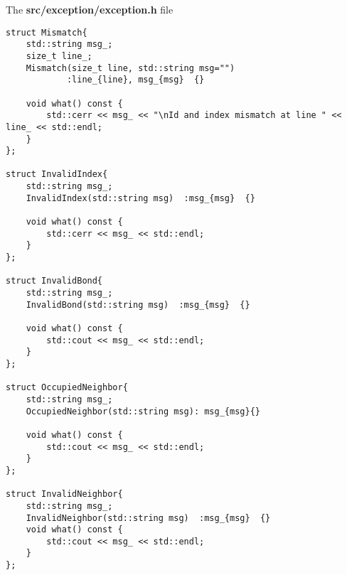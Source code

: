 
The \textbf{src/exception/exception.h} file

\begin{lstlisting}[style=CStyle]
struct Mismatch{
    std::string msg_;
    size_t line_;
    Mismatch(size_t line, std::string msg="")
            :line_{line}, msg_{msg}  {}

    void what() const {
        std::cerr << msg_ << "\nId and index mismatch at line " << line_ << std::endl;
    }
};

struct InvalidIndex{
    std::string msg_;
    InvalidIndex(std::string msg)  :msg_{msg}  {}

    void what() const {
        std::cerr << msg_ << std::endl;
    }
};

struct InvalidBond{
    std::string msg_;
    InvalidBond(std::string msg)  :msg_{msg}  {}

    void what() const {
        std::cout << msg_ << std::endl;
    }
};

struct OccupiedNeighbor{
    std::string msg_;
    OccupiedNeighbor(std::string msg): msg_{msg}{}

    void what() const {
        std::cout << msg_ << std::endl;
    }
};

struct InvalidNeighbor{
    std::string msg_;
    InvalidNeighbor(std::string msg)  :msg_{msg}  {}
    void what() const {
        std::cout << msg_ << std::endl;
    }
};
\end{lstlisting}


